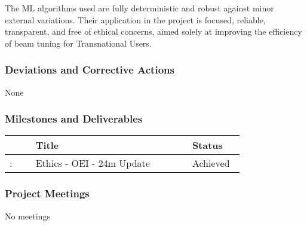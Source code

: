 The ML algorithms used are fully deterministic and robust against minor external variations. Their application in the project is focused, reliable, transparent, and free of ethical concerns, aimed solely at improving the efficiency of beam tuning for Transnational Users.


\subsubsection*{Deviations and Corrective Actions}

None

\subsubsection*{Milestones and Deliverables}

{\fontsize{9}{11}\selectfont
\begin{center}
  \begin{tabular}[t]{!{\color{mygray}\vrule}p{0.10\linewidth}!
  {\color{mygray}\vrule}p{0.60\linewidth}!
  {\color{mygray}\vrule}p{0.20\linewidth}!{\color{mygray}\vrule} } \hline
     & {\bf Title} & {\bf Status} \\ \hline
    : & Ethics - OEI - 24m Update & Achieved \\ \hline
  \end{tabular}
\end{center}
}

\subsubsection*{Project Meetings}

No meetings

